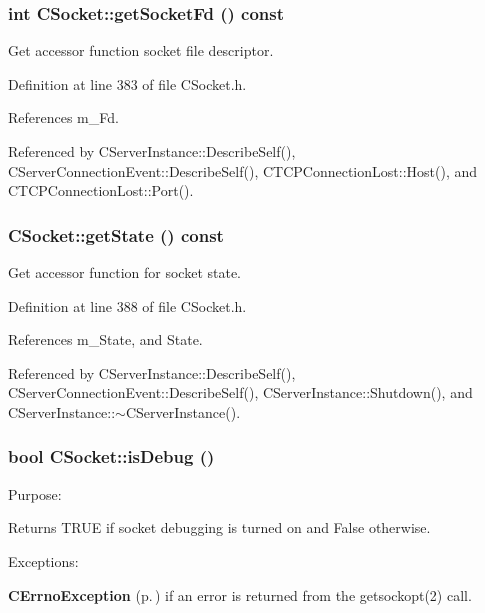 \subsubsection{\setlength{\rightskip}{0pt plus 5cm}int CSocket::get\-Socket\-Fd () const\hspace{0.3cm}{\tt  [inline]}}\label{classCSocket_a3}


Get accessor function socket file descriptor.



Definition at line 383 of file CSocket.h.

References m\_\-Fd.

Referenced by CServer\-Instance::Describe\-Self(), CServer\-Connection\-Event::Describe\-Self(), CTCPConnection\-Lost::Host(), and CTCPConnection\-Lost::Port().
\subsubsection{ CSocket::get\-State () const\hspace{0.3cm}{\tt  [inline]}}\label{classCSocket_a4}


Get accessor function for socket state.



Definition at line 388 of file CSocket.h.

References m\_\-State, and State.

Referenced by CServer\-Instance::Describe\-Self(), CServer\-Connection\-Event::Describe\-Self(), CServer\-Instance::Shutdown(), and CServer\-Instance::$\sim$CServer\-Instance().
\subsubsection{\setlength{\rightskip}{0pt plus 5cm}bool CSocket::is\-Debug ()}\label{classCSocket_a25}


Purpose:

Returns TRUE if socket debugging is turned on and False otherwise.

Exceptions:\begin{CompactItemize}
\item 
{\bf CErrno\-Exception} {\rm (p.\,\pageref{classCErrnoException})} if an error is returned from the getsockopt(2) call. \end{CompactItemize}


